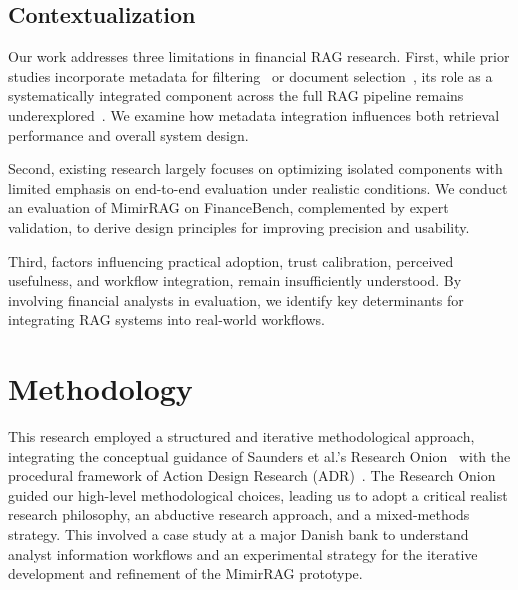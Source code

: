 \documentclass[final,5p,times,twopage,twocolumn,a4paper]{elsarticle}
\begin{document}
\subsection{Contextualization} 
Our work addresses three limitations in financial RAG research. First, while prior studies incorporate metadata for filtering~\cite{sarmah2023towards} or document selection~\cite{lai2024sec}, its role as a systematically integrated component across the full RAG pipeline remains underexplored~\cite{poliakov2024metadata}. We examine how metadata integration influences both retrieval performance and overall system design.

Second, existing research largely focuses on optimizing isolated components with limited emphasis on end-to-end evaluation under realistic conditions. We conduct an evaluation of MimirRAG on FinanceBench, complemented by expert validation, to derive design principles for improving precision and usability.

Third, factors influencing practical adoption, trust calibration, perceived usefulness, and workflow integration, remain insufficiently understood. By involving financial analysts in evaluation, we identify key determinants for integrating RAG systems into real-world workflows.


\section{Methodology}
\label{chap:methodology_framework}
This research employed a structured and iterative methodological approach, integrating the conceptual guidance of Saunders et al.'s Research Onion~\cite{saunders2023researchframework} with the procedural framework of Action Design Research (ADR)~\cite{sein2011actiondesign}. The Research Onion guided our high-level methodological choices, leading us to adopt a critical realist research philosophy, an abductive research approach, and a mixed-methods strategy. This involved a case study at a major Danish bank to understand analyst information workflows and an experimental strategy for the iterative development and refinement of the MimirRAG prototype.
\end{document}
